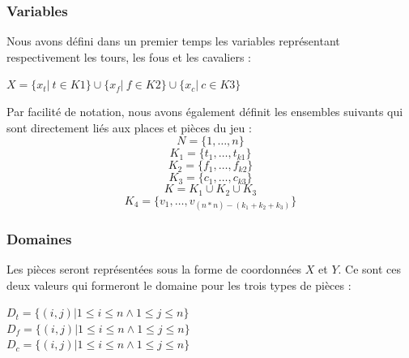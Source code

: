 \documentclass[a4paper]{article}
\begin{document}
\subsubsection{Variables}
Nous avons défini dans un premier temps les variables représentant respectivement les tours, les fous et les cavaliers : 
\begin{center}
$X = \{ x_t | \ t \in K1 \}  \cup \{ x_f | \ f \in K2 \} \cup \{ x_c | \ c \in K3 \}$
\end{center}
Par facilité de notation, nous avons également définit les ensembles suivants qui sont directement liés aux places et pièces du jeu : 
\begin{equation*}
N = \{1,\ldots,n\}
\end{equation*}
\begin{equation*}
K_1 = \{ t_1,\ldots,t_{k1} \}
\end{equation*}
\begin{equation*}
K_2 = \{ f_1,\ldots,f_{k2} \}
\end{equation*}
\begin{equation*}
K_3 = \{ c_1,\ldots,c_{k3} \}
\end{equation*}
\begin{equation*}
K = K_1 \cup K_2 \cup K_3
\end{equation*}
\begin{equation*}
K_4 = \{ v_1,\ldots,v_{(n*n)-(k_1+k_2+k_3)} \}
\end{equation*}
\subsubsection{Domaines}
Les pièces seront représentées sous la forme de coordonnées $X$ et $Y$. Ce sont ces deux valeurs qui formeront le domaine pour les trois types de pièces : 
\begin{center}
$D_t = \{ (i,j) | 1 \leq i \leq n \wedge 1 \leq j \leq n \}$ \\
$D_f = \{ (i,j) | 1 \leq i \leq n \wedge 1 \leq j \leq n \}$ \\
$D_c = \{ (i,j) | 1 \leq i \leq n \wedge 1 \leq j \leq n \}$
\end{center}
\end{document}
